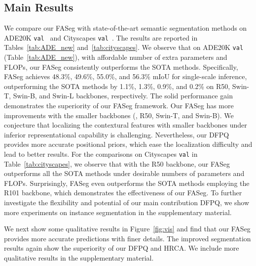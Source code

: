 \vspace{-0.2em}
\subsection{Main Results}
\label{subsec:main_result}
\vspace{-0.2em}

We compare our FASeg with state-of-the-art semantic segmentation methods on ADE20K \texttt{val}~\cite{zhou2017scene} and Cityscapes \texttt{val}~\cite{cordts2016cityscapes}. The results are reported in Tables~\ref{tab:ADE_new} and~\ref{tab:cityscapes}. We observe that on ADE20K \texttt{val} (Table~\ref{tab:ADE_new}), with affordable number of extra parameters and FLOPs, our FASeg consistently outperforms the SOTA methods. Specifically, FASeg achieves 48.3\%, 49.6\%, 55.0\%, and 56.3\% mIoU for single-scale inference, outperforming the SOTA methods by 1.1\%, 1.3\%, 0.9\%, and 0.2\% on R50, Swin-T, Swin-B, and Swin-L backbones, respectively. The solid performance gain demonstrates the superiority of our FASeg framework. Our FASeg has more improvements with the smaller backbones (\eg, R50, Swin-T, and Swin-B). We conjecture that localizing the contextural features with smaller backbones under inferior representational capability is challenging. Nevertheless, our DFPQ provides more accurate positional priors, which ease the localization difficulty and lead to better results. For the comparisons on Cityscapes \texttt{val} in Table~\ref{tab:cityscapes},
we observe that with the R50 backbone, our FASeg outperforms all the SOTA methods under desirable numbers of parameters and FLOPs. Surprisingly, FASeg even outperforms the SOTA methods employing the R101 backbone, which demonstrates the effectiveness of our FASeg. To further investigate the flexibility and potential of our main contribution DFPQ, we show more experiments on instance segmentation in the supplementary material.

We next show some qualitative results in Figure~\ref{fig:vis} and find that our FASeg provides more accurate predictions with finer details. The improved segmentation results again show the superiority of our DFPQ and HRCA. We include more qualitative results in the supplementary material.

